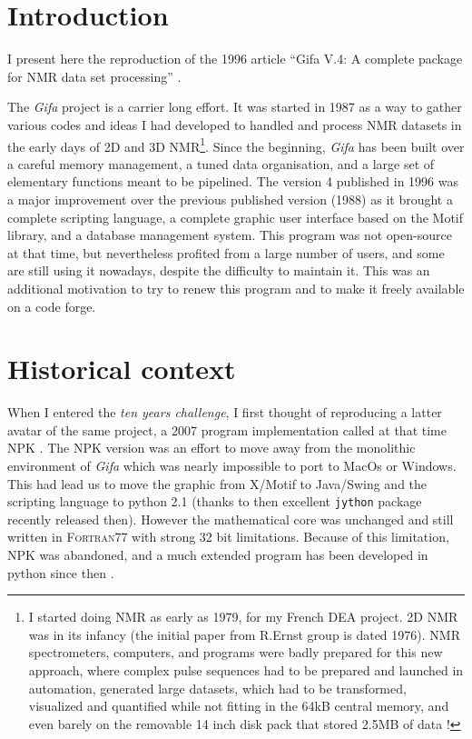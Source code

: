 \hypertarget{introduction}{%
\section{Introduction}\label{introduction}}

I present here the reproduction of the 1996 article ``Gifa V.4: A
complete package for NMR data set processing'' \cite{Pons_1996}.

The \emph{Gifa} project is a carrier long effort. It was started in 1987
as a way to gather various codes and ideas I had developed to handled
and process NMR datasets in the early days of 2D and 3D NMR\footnote{I
  started doing NMR as early as 1979, for my French DEA project. 2D NMR
  was in its infancy (the initial paper from R.Ernst group is dated
  1976). NMR spectrometers, computers, and programs were badly prepared
  for this new approach, where complex pulse sequences had to be
  prepared and launched in automation, generated large datasets, which
  had to be transformed, visualized and quantified while not fitting in
  the 64kB central memory, and even barely on the removable 14 inch disk
  pack that stored 2.5MB of data !}. Since the beginning, \emph{Gifa}
has been built over a careful memory management, a tuned data
organisation, and a large set of elementary functions meant to be
pipelined. The version 4 published in 1996 was a major improvement over
the previous published version (1988) as it brought a complete scripting
language, a complete graphic user interface based on the Motif library,
and a database management system. This program was not open-source at
that time, but nevertheless profited from a large number of users, and
some are still using it nowadays, despite the difficulty to maintain it.
This was an additional motivation to try to renew this program and to
make it freely available on a code forge.

\hypertarget{Historical-context}{%
\section{Historical context}\label{Historical-context}}
When I entered the \emph{ten years challenge}, I first thought of
reproducing a latter avatar of the same project, a 2007 program
implementation called at that time NPK \cite{Tramesel_2007}. The NPK
version was an effort to move away from the monolithic environment of
\emph{Gifa} which was nearly impossible to port to MacOs or Windows.
This had lead us to move the graphic from X/Motif to Java/Swing and the
scripting language to python 2.1 (thanks to then excellent
\texttt{jython} package recently released then). However the
mathematical core was unchanged and still written in F\textsc{ortran}77
with strong 32 bit limitations. Because of this limitation, NPK was
abandoned, and a much extended program has been developed in python
since then \cite{Spike2016}.

